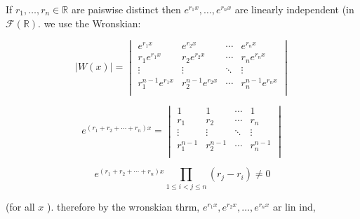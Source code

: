 \begin{example}
  If \( r_1, \dots , r_n  \in \mathbb{R}\)  are paiswise distinct then \(
  e^{r_1x}, \dots , e^{r_nx}\) are linearly independent (in \( \mathscr{F}
  ( \mathbb{R})\). we use the Wronskian: 

  \[ |W(x)| = 
  \begin{vmatrix}
    e^{r_1x} & e^{r_2x} & \cdots & e^{r_nx} \\
    r_1e^{r_1x} & r_2e^{r_2x} & \cdots & r_ne^{r_nx} \\
    \vdots & \vdots & \ddots & \vdots \\
    r_1^{n-1}e^{r_1x} & r_2^{n-1}e^{r_2x} & \cdots & r_n^{n-1}e^{r_nx} \\
  \end{vmatrix}
  \]

  \[ 
  e^{(r_1+r_2+ \cdots +r_n)x} =
  \begin{vmatrix}
    1 & 1 & \cdots & 1  \\
    r_1 & r_2 & \cdots & r_n\\
    \vdots & \vdots & \ddots & \vdots \\
    r_1^{n-1} & r_2^{n-1} & \cdots & r_n^{n-1} \\
  \end{vmatrix}
  \]

  \[ e^{(r_1+r_2+ \cdots +r_n)x} \prod_{1 \leq i < j \leq n}(r_j - r_i) \neq 0 \]

  (for all \( x \) ). therefore by the wronskian thrm, \( e^{r_1x} ,
  e^{r_2x}, \dots , e^{r_nx} \) ar lin ind, 
\end{example}


